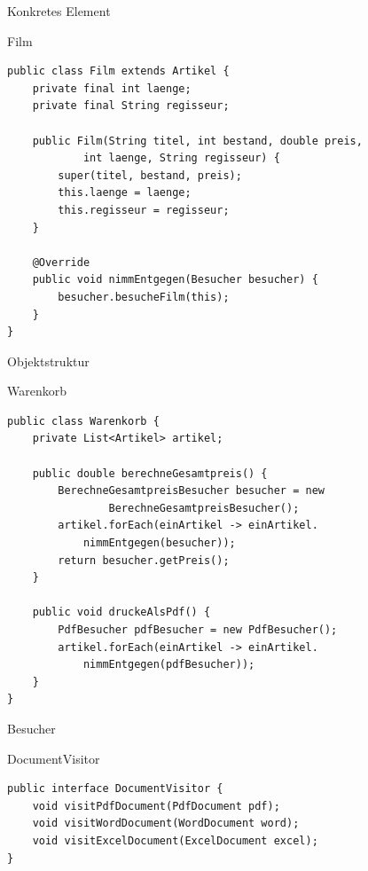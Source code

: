 \begin{frame}[fragile]{Konkretes Element}
	\begin{exampleblock}{Film}
 		\begin{lstlisting}
public class Film extends Artikel {
	private final int laenge;
	private final String regisseur;
	
	public Film(String titel, int bestand, double preis, 
            int laenge, String regisseur) {
		super(titel, bestand, preis);
		this.laenge = laenge;
		this.regisseur = regisseur;
	}
	
	@Override
	public void nimmEntgegen(Besucher besucher) {
		besucher.besucheFilm(this);
	}
}
 		\end{lstlisting}
 	\end{exampleblock}
\end{frame}

\begin{frame}[fragile]{Objektstruktur}
	\begin{exampleblock}{Warenkorb}
 		\begin{lstlisting}
public class Warenkorb {
	private List<Artikel> artikel;
	
	public double berechneGesamtpreis() {
		BerechneGesamtpreisBesucher besucher = new 
				BerechneGesamtpreisBesucher();
		artikel.forEach(einArtikel -> einArtikel.
            nimmEntgegen(besucher));
		return besucher.getPreis();
	}
	
	public void druckeAlsPdf() {
		PdfBesucher pdfBesucher = new PdfBesucher();
		artikel.forEach(einArtikel -> einArtikel.
            nimmEntgegen(pdfBesucher));
	}
} 		    
 		\end{lstlisting}
 	\end{exampleblock}
\end{frame}


\begin{frame}[fragile]{Besucher}
	\begin{exampleblock}{DocumentVisitor}
 		\begin{lstlisting}
public interface DocumentVisitor {
    void visitPdfDocument(PdfDocument pdf);
    void visitWordDocument(WordDocument word);
    void visitExcelDocument(ExcelDocument excel);
}
        \end{lstlisting}
 	\end{exampleblock}
\end{frame}


